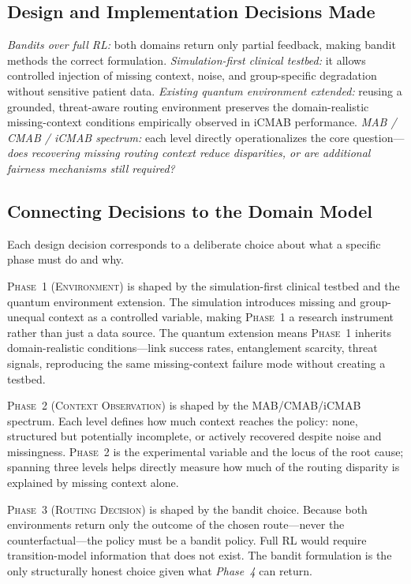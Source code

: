 \documentclass{IEEEtran}
\begin{document}
\subsection{Design and Implementation Decisions Made}
\textit{Bandits over full RL:} both domains return only partial feedback,
making bandit methods the correct formulation. \textit{Simulation-first
clinical testbed:} it allows controlled injection of missing context,
noise, and group-specific degradation without sensitive patient data.
\textit{Existing quantum environment extended:} reusing a grounded,
threat-aware routing environment preserves the domain-realistic missing-context
conditions empirically observed in iCMAB performance. \textit{MAB / CMAB /
iCMAB spectrum:} each level directly operationalizes the core
question---\textit{does recovering missing routing context reduce disparities, or are
additional fairness mechanisms still required?}

\subsection{Connecting Decisions to the Domain Model}
Each design decision corresponds to a deliberate choice about what a specific
phase must do and why.

\textsc{Phase~1 (Environment)} is shaped by the simulation-first clinical
testbed and the quantum environment extension. The simulation introduces
missing and group-unequal context as a controlled variable, making \textsc{Phase~1}
a research instrument rather than just a data source. The quantum extension
means \textsc{Phase~1} inherits domain-realistic conditions---link success rates,
entanglement scarcity, threat signals, reproducing the same
missing-context failure mode without creating a testbed.

\textsc{Phase~2 (Context Observation)} is shaped by the MAB/CMAB/iCMAB
spectrum. Each level defines how much context reaches the policy: none,
structured but potentially incomplete, or actively recovered despite noise
and missingness. \textsc{Phase~2} is the experimental variable and the locus of the
root cause; spanning three levels helps directly measure how much of the routing 
disparity is explained by missing context alone.

\textsc{Phase~3 (Routing Decision)} is shaped by the bandit choice. Because
both environments return only the outcome of the chosen route---never the
counterfactual---the policy must be a bandit policy. Full RL would require
transition-model information that does not exist. The bandit formulation is
the only structurally honest choice given what \textit{Phase~4} can return.
\end{document}
